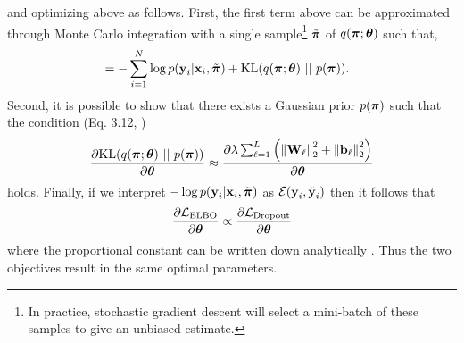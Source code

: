and optimizing  above as follows. First, the first term above can be approximated through Monte Carlo integration with a single sample\footnote{In practice, stochastic gradient descent will select a mini-batch of these samples to give an unbiased estimate.} $\tilde{\boldsymbol{\mathbf{\pi}}}$ of $q(\boldsymbol{\mathbf{\pi}}; \boldsymbol{\mathbf{\theta}})$ such that, 
\begin{align}
	&= - \sum_{i=1}^N \log p(\boldsymbol{\mathbf{y}}_i | \boldsymbol{\mathbf{x}}_i, \tilde{\boldsymbol{\mathbf{\pi}}})  + \text{KL}(q(\boldsymbol{\mathbf{\pi}}; \boldsymbol{\mathbf{\theta}}) ~ || ~ p(\boldsymbol{\mathbf{\pi}})).
\end{align}
Second, it is possible to show that there exists a Gaussian prior $p(\boldsymbol{\mathbf{\pi}})$ such that the condition (Eq. 3.12, \cite{Gal2016UncertaintyThesis})
\begin{align}
\dfrac{\partial \text{KL}(q(\boldsymbol{\mathbf{\pi}}; \boldsymbol{\mathbf{\theta}}) ~ || ~ p(\boldsymbol{\mathbf{\pi}}))}{\partial \boldsymbol{\mathbf{\theta}}} \approx \dfrac{\partial \lambda \sum_{\ell=1}^L	\left( \left\Vert\boldsymbol{\mathbf{W}}_\ell\right\Vert_2^2 +  \left\Vert\boldsymbol{\mathbf{b}}_\ell\right\Vert_2^2\right)}{\partial \boldsymbol{\mathbf{\theta}}}	
\end{align}
holds. Finally, if we interpret $-\log p(\boldsymbol{\mathbf{y}}_i | \boldsymbol{\mathbf{x}}_i, \tilde{\boldsymbol{\mathbf{\pi}}})$ as $\mathcal{E}(\boldsymbol{\mathbf{y}}_i, \tilde{\boldsymbol{\mathbf{y}}}_i)$ then it follows that
\begin{align}
\dfrac{\partial \mathcal{L}_{\text{ELBO}}}{\partial \boldsymbol{\mathbf{\theta}}} \propto \dfrac{\partial \mathcal{L}_{\text{Dropout}}}{\partial \boldsymbol{\mathbf{\theta}}}
\end{align} where the proportional constant can be written down analytically \citep{Gal2016UncertaintyThesis}. Thus the two objectives result in the same optimal parameters.
